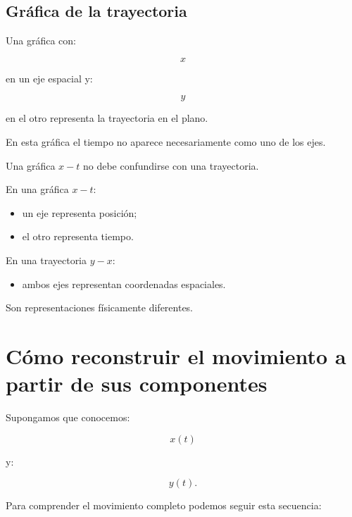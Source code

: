 \subsection{Gráfica de la trayectoria}

Una gráfica con:

\[
x
\]

en un eje espacial y:

\[
y
\]

en el otro representa la trayectoria en el plano.

En esta gráfica el tiempo no aparece necesariamente como uno de los ejes.

\begin{errorfrecuente}
Una gráfica \(x-t\) no debe confundirse con una trayectoria.

En una gráfica \(x-t\):

\begin{itemize}
    \item un eje representa posición;
    \item el otro representa tiempo.
\end{itemize}

En una trayectoria \(y-x\):

\begin{itemize}
    \item ambos ejes representan coordenadas espaciales.
\end{itemize}

Son representaciones físicamente diferentes.
\end{errorfrecuente}


\section{Cómo reconstruir el movimiento a partir de sus componentes}

Supongamos que conocemos:

\[
x(t)
\]

y:

\[
y(t).
\]

Para comprender el movimiento completo podemos seguir esta secuencia:

